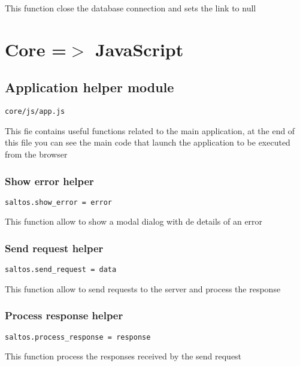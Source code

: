 \documentclass[a4paper]{book}
\begin{document}
This function close the database connection and sets the link to null


\hypertarget{toc351}{}
\chapter{Core =$>$ JavaScript}

\hypertarget{toc352}{}
\section{Application helper module}

\begin{lstlisting}
core/js/app.js
\end{lstlisting}

This fie contains useful functions related to the main application, at the end of this file you can
see the main code that launch the application to be executed from the browser

\hypertarget{toc353}{}
\subsection{Show error helper}

\begin{lstlisting}
saltos.show_error = error
\end{lstlisting}

This function allow to show a modal dialog with de details of an error

\hypertarget{toc354}{}
\subsection{Send request helper}

\begin{lstlisting}
saltos.send_request = data
\end{lstlisting}

This function allow to send requests to the server and process the response

\hypertarget{toc355}{}
\subsection{Process response helper}

\begin{lstlisting}
saltos.process_response = response
\end{lstlisting}

This function process the responses received by the send request
\end{document}
